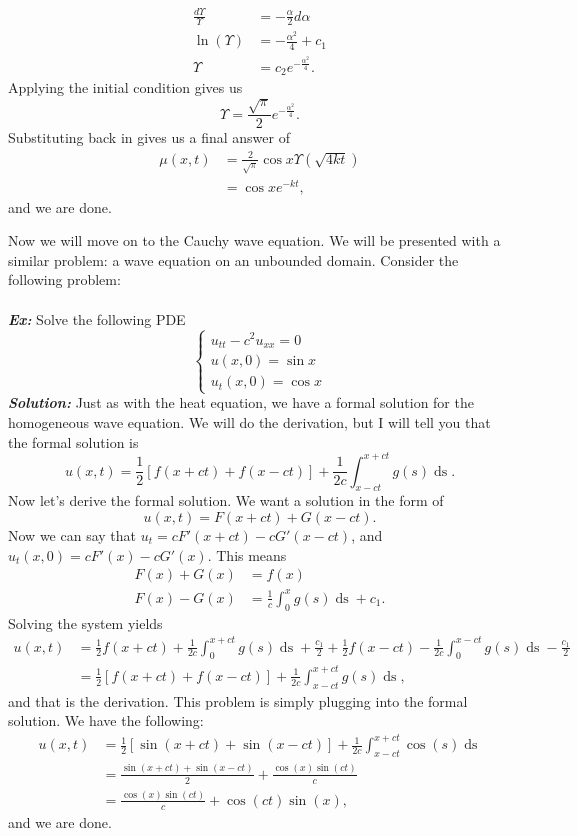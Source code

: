 \begin{align*}
\frac{d\Upsilon}{\Upsilon} &= -\frac{\alpha}{2}d\alpha\\
\ln{(\Upsilon)} &= -\frac{\alpha^{2}}{4} + c_{1}\\
\Upsilon &= c_{2}e^{-\frac{\alpha^{2}}{4}}.
\end{align*}
Applying the initial condition gives us
\[
\Upsilon = \frac{\sqrt{\pi}}{2}e^{-\frac{\alpha^{2}}{4}}.
\]
Substituting back in gives us a final answer of
\begin{align*}
\mu(x,t) &= \frac{2}{\sqrt{\pi}}\cos{x}\Upsilon(\sqrt{4kt})\\
&= \cos{x}e^{-kt},
\end{align*}
and we are done.


\newpage
\indent Now we will move on to the Cauchy wave equation. We will be presented with a similar problem: a wave equation on an unbounded domain. Consider the following problem:
\noindent \\\\
\noindent \textbf{\textit{Ex:}} Solve the following PDE
\[
\begin{cases}
u_{tt} - c^{2}u_{xx} = 0\\
u(x,0) = \sin{x}\\
u_{t}(x,0) = \cos{x}
\end{cases}
\]
\indent \textbf{\textit{Solution:}} Just as with the heat equation, we have a formal solution for the homogeneous wave equation. We will do the derivation, but I will tell you that the formal solution is
\[
u(x,t) = \frac{1}{2}\left[f(x+ct) + f(x-ct)\right] + \frac{1}{2c}\int_{x-ct}^{x+ct}g(s)\mathop{ds}.
\]
Now let's derive the formal solution. We want a solution in the form of
\[
u(x,t) = F(x+ct) + G(x-ct).
\]
Now we can say that $u_{t} = cF'(x+ct) - cG'(x-ct)$, and $u_{t}(x,0) = cF'(x) - cG'(x)$. This means
\begin{align*}
F(x) + G(x) &= f(x)\\
F(x) - G(x) &= \frac{1}{c}\int_{0}^{x}g(s)\mathop{ds} + c_{1}.
\end{align*}
Solving the system yields
\begin{align*}
u(x,t) &= \frac{1}{2} f(x+ct) + \frac{1}{2c}\int_{0}^{x+ct}g(s)\mathop{ds} + \frac{c_{1}}{2} + \frac{1}{2}f(x-ct) -\frac{1}{2c}\int_{0}^{x-ct}g(s)\mathop{ds} - \frac{c_{1}}{2}\\
&= \frac{1}{2}\left[f(x+ct) + f(x-ct)\right] + \frac{1}{2c}\int_{x-ct}^{x+ct}g(s)\mathop{ds},
\end{align*}
and that is the derivation. This problem is simply plugging into the formal solution. We have the following:
\begin{align*}
u(x,t) &= \frac{1}{2}\left[\sin{(x+ct)} + \sin{(x-ct)}\right] + \frac{1}{2c}\int_{x-ct}^{x+ct}\cos{(s)}\mathop{ds}\\
&= \frac{\sin{(x+ct)} + \sin{(x-ct)}}{2} + \frac{\cos{(x)}\sin{(ct)}}{c}\\
&=  \frac{\cos{(x)}\sin{(ct)}}{c} + \cos{(ct)}\sin{(x)},
\end{align*}
and we are done.


